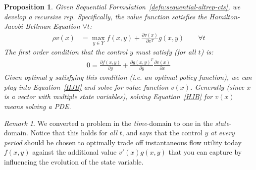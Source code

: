 \documentclass[12pt]{article}
\numberwithin{equation}{section} %
\theoremstyle{plain}
\newtheorem{prop}[thm]{Proposition}
\theoremstyle{definition}
\theoremstyle{remark}
\newtheorem*{rmk}{Remark}
\begin{document}
\begin{prop}
Given Sequential Formulation~\ref{defn:sequential-altrep-cts},
we develop a recursive rep.
Specifically, the value function satisfies the
\emph{Hamilton-Jacobi-Bellman Equation} $\forall t$:
\begin{align}
  \rho v(x)
  &= \max_{y\in Y} f(x,y) + \frac{\partial v(x)}{\partial x^T} g(x,y)
  \qquad\forall t
  \label{HJB}
\end{align}
The first order condition that the control $y$ must satisfy (for all
$t$) is:
\begin{align*}
  0 =
  \frac{\partial f(x,y)}{\partial y}
  +
  \frac{\partial g(x,y)^T}{\partial y}
  \frac{\partial v(x)}{\partial x}
\end{align*}
Given optimal $y$ satisfying this condition (i.e. an optimal policy
function), we can plug into Equation~\ref{HJB} and solve for value
function $v(x)$.
Generally (since $x$ is a vector with multiple state variables), solving
Equation~\ref{HJB} for $v(x)$ means solving a PDE.
\end{prop}
\begin{rmk}
We converted a problem in the \emph{time}-domain to one in the
\emph{state}-domain. Notice that this holds for \emph{all} $t$, and says
that the control $y$ \emph{at every period} should be chosen to
optimally trade off instantaneous flow utility today $f(x,y)$ against
the additional value $v'(x)g(x,y)$ that you can capture by influencing
the evolution of the state variable.
\end{rmk}
\end{document}
